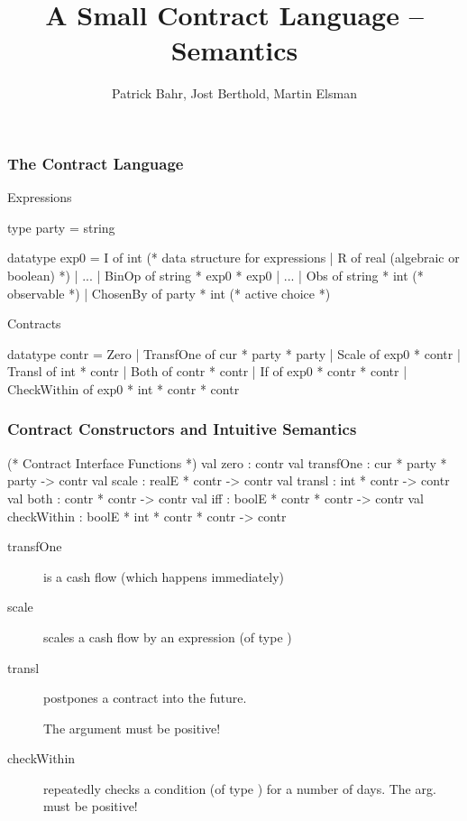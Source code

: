 \documentclass[xcolor=dvipsnames,12pt]{beamer}
\title{A Small Contract Language -- Semantics}
\author[Bahr,Berthold,Elsman]{Patrick Bahr, Jost Berthold, Martin Elsman}
\renewcommand{\emph}[1]{\textcolor{structure!60}{#1}}
\begin{document}
\frame[plain]{\titlepage}

\begin{frame}[fragile,t]
    \frametitle{The Contract Language}
\emph{Expressions}
\begin{mlcode}
type party = string
                       
datatype exp0 = I of int (* data structure for expressions 
              | R of real   (algebraic or boolean) *)
              | ...
              | BinOp of string * exp0 * exp0
              | ...
              | Obs of string * int     (* observable *)
              | ChosenBy of party * int (* active choice *)
\end{mlcode}

\emph{Contracts}
\begin{mlcode}
datatype contr =
       Zero
     | TransfOne of cur * party * party
     | Scale of exp0 * contr
     | Transl of int * contr
     | Both of contr * contr
     | If of exp0 * contr * contr
     | CheckWithin of exp0 * int * contr * contr
\end{mlcode}
%
\end{frame}

\begin{frame}[fragile,t]
    \frametitle{Contract Constructors and Intuitive Semantics}

\begin{mlcode}
  (* Contract Interface Functions *)
  val zero        : contr
  val transfOne   : cur * party * party -> contr
  val scale       : realE * contr -> contr
  val transl      : int * contr -> contr
  val both        : contr * contr -> contr
  val iff         : boolE * contr * contr -> contr
  val checkWithin : boolE * int * contr * contr -> contr 
\end{mlcode}

\begin{description}
\item[transfOne] is a cash flow (which happens immediately)
\item[scale] scales a cash flow by an expression (of type )
\item[transl] postpones a contract into the \emph{future}.

    The  argument must be positive!

\item[checkWithin] repeatedly checks a condition (of type ) for a number of days.
    The  arg. must be positive!
\end{description}

\end{frame}
\end{document}
